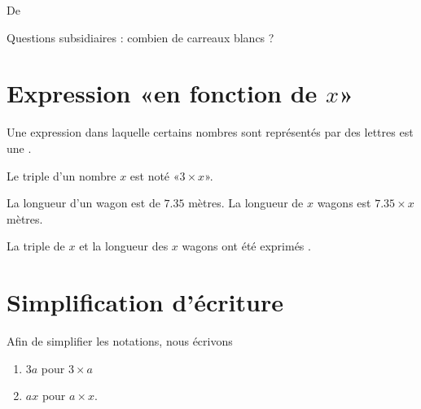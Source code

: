 


De \cite{NRHooXFvgpp5}

Questions subsidiaires : combien de carreaux blancs ?

\section{Expression «en fonction de \( x\)» }

\begin{definition}
    Une expression dans laquelle certains nombres sont représentés par des lettres est une .
\end{definition}

\begin{example}
    Le triple d'un nombre \( x\) est noté «\( 3\times x\)».
\end{example}

\begin{example}
    La longueur d'un wagon est de \( 7.35\) mètres. La longueur de \( x\) wagons est \( 7.35\times x\) mètres.
\end{example}

La triple de \( x\) et la longueur des \( x\) wagons ont été exprimés .

\section{Simplification d'écriture}

\begin{Aretenir}
    Afin de simplifier les notations, nous écrivons
    \begin{enumerate}
        \item
            \( 3a\) pour \( 3\times a\)
        \item
            \( ax\) pour \( a\times x\).
    \end{enumerate}
\end{Aretenir}

